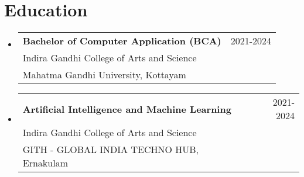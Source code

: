 \documentclass[a4paper,10pt]{article}
\begin{document}
\section*{Education}
\begin{itemize}[leftmargin=0.15in]
    \item \begin{tabularx}{\textwidth}{Xr}
        \textbf{Bachelor of Computer Application (BCA)} & 2021-2024 \\
        Indira Gandhi College of Arts and Science & \\
        Mahatma Gandhi University, Kottayam &
    \end{tabularx}
    \item \begin{tabularx}{\textwidth}{Xr}
        \textbf{Artificial Intelligence and Machine Learning} & 2021-2024 \\
        Indira Gandhi College of Arts and Science & \\
        GITH - GLOBAL INDIA TECHNO HUB, Ernakulam &
    \end{tabularx}
\end{itemize}
\end{document}
